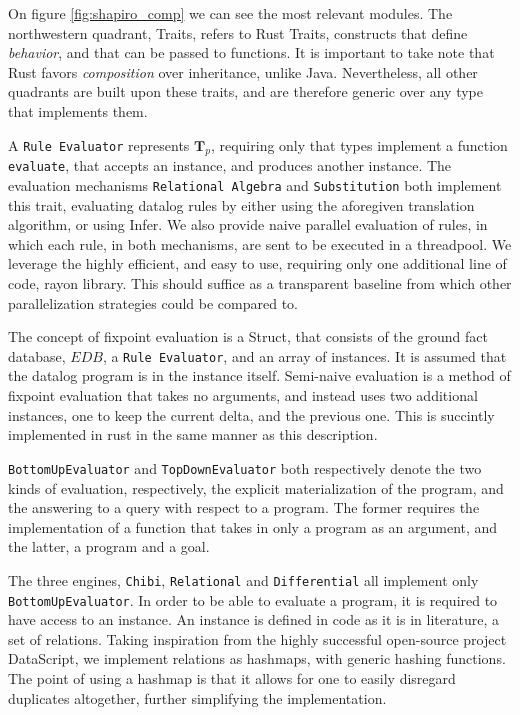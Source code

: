 \documentclass[manuscript,screen,review]{acmart}
\theoremstyle{definition}
\begin{document}
On figure \ref{fig:shapiro_comp} we can see the most relevant modules. The northwestern quadrant, Traits, refers to Rust Traits, constructs that
define \textit{behavior}, and that can be passed to functions. It is important to take note that Rust favors \textit{composition} over inheritance, unlike Java.
Nevertheless, all other quadrants are built upon these traits, and are therefore generic over any type that implements them.

A \verb|Rule Evaluator| represents $\textbf{T}_p$, requiring only that types implement a function \verb|evaluate|, that accepts an instance,
and produces another instance. The evaluation mechanisms \verb|Relational Algebra| and \verb|Substitution| both implement this trait,
evaluating datalog rules by either using the aforegiven translation algorithm, or using Infer. We also provide naive parallel evaluation of rules,
in which each rule, in both mechanisms, are sent to be executed in a threadpool. We leverage the highly efficient, and easy to use, requiring
only one additional line of code, rayon\cite{rayon} library. This should suffice as a transparent baseline from which other parallelization
strategies could be compared to.

The concept of fixpoint evaluation is a Struct, that consists of the ground fact database, $EDB$, a \verb|Rule Evaluator|, and an array of
instances. It is assumed that the datalog program is in the instance itself. Semi-naive evaluation is a method of fixpoint evaluation that takes
no arguments, and instead uses two additional instances, one to keep the current delta, and the previous one. This is succintly implemented in rust
in the same manner as this description.

\verb|BottomUpEvaluator| and \verb|TopDownEvaluator| both respectively denote the two kinds of evaluation, respectively, the explicit
materialization of the program, and the answering to a query with respect to a program. The former requires the implementation of a function that takes
in only a program as an argument, and the latter, a program and a goal.

The three engines, \verb|Chibi|, \verb|Relational| and \verb|Differential| all implement only \verb|BottomUpEvaluator|. In order to be able to
evaluate a program, it is required to have access to an instance. An instance is defined in code as it is in literature, a set of relations. Taking
inspiration from the highly successful open-source project DataScript\cite{datascript}, we implement relations as hashmaps, with generic hashing
functions. The point of using a hashmap is that it allows for one to easily disregard duplicates altogether, further simplifying the implementation.
\end{document}
